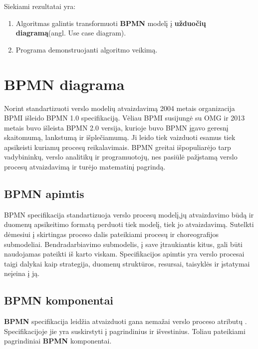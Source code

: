 \documentclass{VUMIFInfBakalaurinis}
\begin{document}
Siekiami rezultatai yra:
\begin{enumerate}
	\item Algoritmas galintis transformuoti \textbf{BPMN} modelį į \textbf{užduočių diagramą}(angl. Use case diagram).
	\item Programa demonstruojanti algoritmo veikimą.
\end{enumerate}


\section{\textbf{BPMN} diagrama}
Norint standartizuoti verslo modelių atvaizdavimą 2004 metais organizacija BPMI išleido BPMN 1.0 specifikaciją. Vėliau BPMI susijungė su OMG ir 2013 metais buvo išleista BPMN 2.0 versija, kurioje buvo BPMN įgavo geresnį skaitomumą, lankstumą ir išplečiamumą. Ji leido tiek vaizduoti esamus tiek apsikeisti kuriamų procesų reikalavimais. BPMN greitai išpopuliarėjo tarp vadybininkų, verslo analitikų ir programuotojų, nes pasiūlė pažįstamą verslo procesų atvaizdavimą ir turėjo matematinį pagrindą.

\subsection{\textbf{BPMN} apimtis}
BPMN specifikacija standartizuoja verslo procesų modelį,jų atvaizdavimo būdą ir duomenų apsikeitimo formatą perduoti tiek modelį, tiek jo atvaizdavimą. Sutelkti dėmesiui į skirtingas proceso dalis pateikiami procesų ir choreografijos submodeliai. Bendradarbiavimo submodelis, į save įtraukiantis kitus, gali būti naudojamas pateikti iš karto viskam. Specifikacijos apimtis yra verslo procesai taigi dalykai kaip strategija, duomenų struktūros, resursai, taisyklės ir įstatymai neįeina į ją. 
 
\subsection{\textbf{BPMN} komponentai} \label{section:bpmn_components}
\textbf{BPMN} specifikacija leidžia atvaizduoti gana nemažai verslo proceso atributų \cite{bpmnFormal}. Specifikacijoje jie yra suskirstyti į pagrindinius ir išvestinius. Toliau pateikiami pagrindiniai \textbf{BPMN} komponentai.
\end{document}
